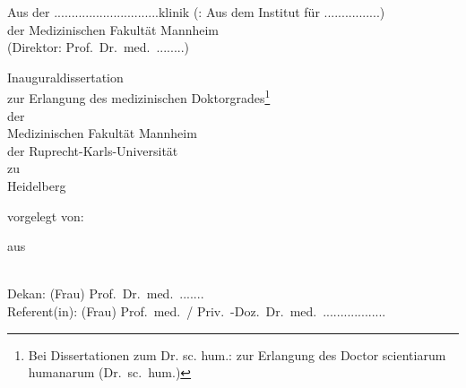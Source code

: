 \makeatletter%
%
\begin{titlepage}%
    \thispagestyle{empty}%
    \begin{center}%
        \null\vfill
        
        Aus der ..............................klinik (\bzw: Aus dem Institut für ................)\\
        der Medizinischen Fakultät Mannheim\\
        (Direktor: Prof.\ Dr.\ med.\ ........)

        \vspace*{6\baselineskip}
        {\large\@title}%
        \vspace*{6\baselineskip}%

        Inauguraldissertation\\
        zur Erlangung des medizinischen Doktorgrades\footnote{Bei Dissertationen zum Dr. sc. hum.: zur Erlangung des Doctor scientiarum humanarum (Dr.\ sc.\ hum.)}\\
        der\\
        Medizinischen Fakultät Mannheim\\
        der Ruprecht-Karls-Universität\\
        zu\\
        Heidelberg%
        
        \vspace*{4\baselineskip}%
        vorgelegt von:\\
        \@author%
        
        \vspace*{\baselineskip}%
        aus\\%
        \@birthplace\\
        \@submitdate%
        \vfill%
        \vfill%
    \end{center}%

    \clearpage

    \pagestyle{plain}%
    \thispagestyle{empty}%
    
    \begin{center}
        \vspace*{\fill}
        \vspace*{\fill}
        \vspace*{\fill}
        \vspace*{\fill}

        Dekan: (Frau) Prof.\ Dr.\ med.\ .......\\
        Referent(in): (Frau) Prof.\ med.\ / Priv.\ -Doz.\ Dr.\ med.\ ..................
        \vspace*{\fill}
        
    \end{center}

\end{titlepage}%
\makeatother%
%